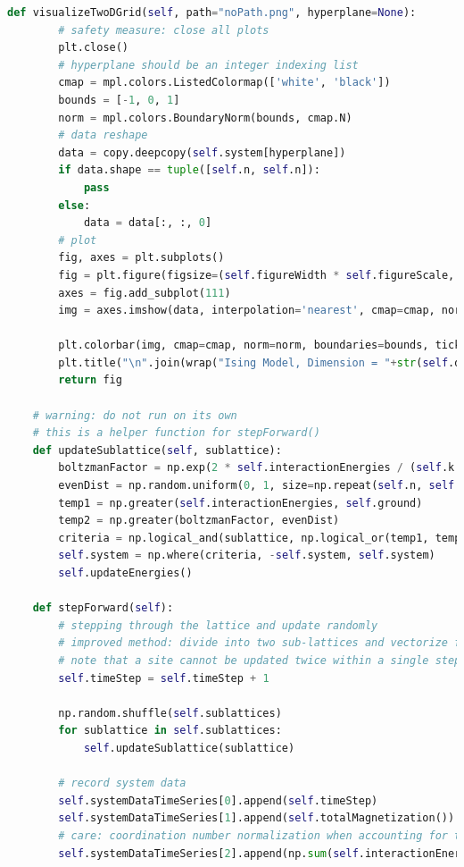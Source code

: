 \documentclass[%
showkeys,
bibnotes,
amsmath,amssymb,
floatfix,
]{revtex4-1}
\begin{document}
\begin{lstlisting}[language=Python]
    def visualizeTwoDGrid(self, path="noPath.png", hyperplane=None):
        # safety measure: close all plots
        plt.close()
        # hyperplane should be an integer indexing list
        cmap = mpl.colors.ListedColormap(['white', 'black'])
        bounds = [-1, 0, 1]
        norm = mpl.colors.BoundaryNorm(bounds, cmap.N)
        # data reshape
        data = copy.deepcopy(self.system[hyperplane])
        if data.shape == tuple([self.n, self.n]):
            pass
        else:
            data = data[:, :, 0]
        # plot
        fig, axes = plt.subplots()
        fig = plt.figure(figsize=(self.figureWidth * self.figureScale, self.figureHeight * self.figureScale))
        axes = fig.add_subplot(111)
        img = axes.imshow(data, interpolation='nearest', cmap=cmap, norm=norm, animated=True)

        plt.colorbar(img, cmap=cmap, norm=norm, boundaries=bounds, ticks=[-1, 0, 1])
        plt.title("\n".join(wrap("Ising Model, Dimension = "+str(self.d)+", N = "+str(self.n)+", Tc = "+str(sigfig.round(float(self.tc), sigfigs=4))+"K, T = "+str(sigfig.round(float(self.t), sigfigs=4)) + "K, Time = "+str(self.timeStep)+"au", 60)))
        return fig

    # warning: do not run on its own
    # this is a helper function for stepForward()
    def updateSublattice(self, sublattice):
        boltzmanFactor = np.exp(2 * self.interactionEnergies / (self.k * self.t))
        evenDist = np.random.uniform(0, 1, size=np.repeat(self.n, self.d))
        temp1 = np.greater(self.interactionEnergies, self.ground)
        temp2 = np.greater(boltzmanFactor, evenDist)
        criteria = np.logical_and(sublattice, np.logical_or(temp1, temp2))
        self.system = np.where(criteria, -self.system, self.system)
        self.updateEnergies()

    def stepForward(self):
        # stepping through the lattice and update randomly
        # improved method: divide into two sub-lattices and vectorize for each sub lattice to allow batch processing
        # note that a site cannot be updated twice within a single step, and two neighbouring sites should not be updated simultaneously
        self.timeStep = self.timeStep + 1

        np.random.shuffle(self.sublattices)
        for sublattice in self.sublattices:
            self.updateSublattice(sublattice)

        # record system data
        self.systemDataTimeSeries[0].append(self.timeStep)
        self.systemDataTimeSeries[1].append(self.totalMagnetization())
        # care: coordination number normalization when accounting for total energy to avoid double counting
        self.systemDataTimeSeries[2].append(np.sum(self.interactionEnergies) / 2)



\end{lstlisting}
\end{document}
